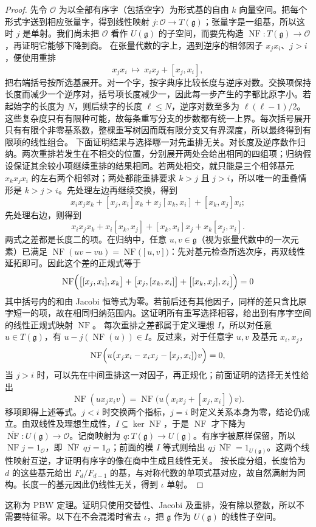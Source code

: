 \begin{proof}
	先令 \(\mathcal O\) 为以全部有序字（包括空字）为形式基的自由 \(k\) 向量空间。把每个形式字送到相应张量字，得到线性映射 \(j:\mathcal O\to T(\mathfrak g)\)；张量字是一组基，所以这时 \(j\) 是单射。我们尚未把 \(\mathcal O\) 看作 \(U(\mathfrak g)\) 的子空间，而要先构造 \(\operatorname{NF}:T(\mathfrak g)\to\mathcal O\)，再证明它能够下降到商。 在张量代数的字上，遇到逆序的相邻因子 \(x_jx_i\)、\(j>i\)，便使用重排
	\[
		x_jx_i\ \longmapsto\ x_ix_j+[x_j,x_i],
	\]
	把右端括号按所选基展开。对一个字，按字典序比较长度与逆序对数。交换项保持长度而减少一个逆序对，括号项长度减少一，因此每一步产生的字都比原字小。若起始字的长度为 \(N\)，则后续字的长度 \(\ell\le N\)，逆序对数至多为 \(\ell(\ell-1)/2\)。这些复杂度只有有限种可能，故每条重写分支的步数都有统一上界。每次括号展开只有有限个非零基系数，整棵重写树因而既有限分支又有界深度，所以最终得到有限项的线性组合。 下面证明结果与选择哪一对先重排无关。对长度及逆序数作归纳。两次重排若发生在不相交的位置，分别展开两处会给出相同的四组项；归纳假设保证其余较小项继续重排的结果相同。若两处相交，就只能是三个相邻基元 \(x_kx_jx_i\) 的左右两个相邻对；两处都能重排要求 \(k>j\) 且 \(j>i\)，所以唯一的重叠情形是 \(k>j>i\)。先处理左边再继续交换，得到
	\[
		x_ix_jx_k+[x_j,x_i]x_k+x_j[x_k,x_i]+[x_k,x_j]x_i;
	\]
	先处理右边，则得到
	\[
		x_ix_jx_k+x_i[x_k,x_j]+[x_k,x_i]x_j+x_k[x_j,x_i].
	\]
	两式之差都是长度二的项。在归纳中，任意 \(u,v\in\mathfrak g\)（视为张量代数中的一次元素）已满足 \(\operatorname{NF}(uv-vu)=\operatorname{NF}\bigl([u,v]\bigr)\)：先对基元检查所选次序，再双线性延拓即可。因此这个差的正规式等于
	\[
		\operatorname{NF}\Bigl( \bigl[[x_j,x_i],x_k\bigr]+\bigl[x_j,[x_k,x_i]\bigr]+\bigl[[x_k,x_j],x_i\bigr] \Bigr)=0
	\]
	其中括号内的和由 Jacobi 恒等式为零。若前后还有其他因子，同样的差只含比原字短一的项，故在相同归纳范围内。这证明所有重写选择相容，给出到有序字空间的线性正规式映射 \(\operatorname{NF}\)。 每次重排之差都属于定义理想 \(I\)，所以对任意 \(u\in T(\mathfrak g)\)，有 \(u-j(\operatorname{NF}(u))\in I\)。反过来，对于任意字 \(u,v\) 及基元 \(x_i,x_j\)，
	\[
		\operatorname{NF}\Bigl(u\bigl(x_jx_i-x_ix_j-[x_j,x_i]\bigr)v\Bigr)=0,
	\]
	当 \(j>i\) 时，可以先在中间重排这一对因子，再正规化；前面证明的选择无关性给出
	\[
		\operatorname{NF}(ux_jx_iv) =\operatorname{NF}\bigl(u(x_ix_j+[x_j,x_i])v\bigr).
	\]
	移项即得上述等式。\(j<i\) 时交换两个指标，\(j=i\) 时定义关系本身为零，结论仍成立。由双线性及理想生成性，\(I\subseteq\ker\operatorname{NF}\)，于是 \(\operatorname{NF}\) 才下降为 \(\overline{\operatorname{NF}}:U(\mathfrak g)\to\mathcal O\)。记商映射为 \(q:T(\mathfrak g)\to U(\mathfrak g)\)。有序字被原样保留，所以 \(\operatorname{NF}j=1_{\mathcal O}\)，即 \(\overline{\operatorname{NF}}\,qj=1_{\mathcal O}\)；前面的模 \(I\) 等式则给出 \(qj\,\overline{\operatorname{NF}}=1_{U(\mathfrak g)}\)。这两个线性映射互逆，才证明有序字的像在商中生成且线性无关。 按长度分组，长度恰为 \(d\) 的这些基元给出 \(F_d/F_{d-1}\) 的基，与对称代数的单项式基对应，故自然满射为同构。长度一的基元因此仍线性无关，得到 \(\iota\) 单射。
\end{proof}
这称为 PBW 定理。证明只使用交替性、Jacobi 及重排，没有除以整数，所以不需要特征零。以下在不会混淆时省去 \(\iota\)，把 \(\mathfrak g\) 作为 \(U(\mathfrak g)\) 的线性子空间。

